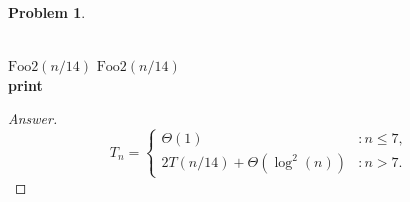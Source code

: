\documentclass[11pt]{article}
\theoremstyle{definition}
\theoremstyle{definition}
\newtheorem{required}{Problem}
\theoremstyle{definition}
\begin{document}
\begin{required}
\begin{enumerate}[label=(\alph*)]
\begin{algorithm}
\begin{algorithmic}[1]
\noindent \\
\State $\text{Foo2}(n/14)$
\State $\text{Foo2}(n/14)$ \\
    
        \State \textbf{print} 
    \EndFor
\EndFor
\EndProcedure
\end{algorithmic}
\end{algorithm}

\begin{proof}[Answer]
\[
T_{n} = \begin{cases} \Theta(1)& : n \leq 7, \\
	2T(n/14) + \Theta(\log^2(n))& : n > 7.
\end{cases}
\]
\end{proof}

\end{enumerate}

\end{required}
\end{document}
